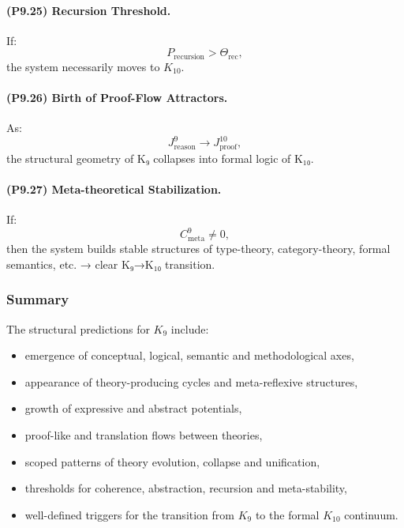 \paragraph{(P9.25) Recursion Threshold.}
If:
\[
P_{\mathrm{recursion}} > \Theta_{\mathrm{rec}},
\]
the system necessarily moves to $K_{10}$.

\paragraph{(P9.26) Birth of Proof-Flow Attractors.}
As:
\[
J_{\mathrm{reason}}^9 
\to 
J_{\mathrm{proof}}^{10},
\]
the structural geometry of K₉ collapses into formal logic of K₁₀.

\paragraph{(P9.27) Meta-theoretical Stabilization.}
If:
\[
C_{\mathrm{meta}}^9 \neq 0,
\]
then the system builds stable structures of type-theory, category-theory, formal semantics, etc. → clear K₉→K₁₀ transition.

\subsubsection{Summary}

The structural predictions for $K_9$ include:
\begin{itemize}
    \item emergence of conceptual, logical, semantic and methodological axes,
    \item appearance of theory-producing cycles and meta-reflexive structures,
    \item growth of expressive and abstract potentials,
    \item proof-like and translation flows between theories,
    \item scoped patterns of theory evolution, collapse and unification,
    \item thresholds for coherence, abstraction, recursion and meta-stability,
    \item well-defined triggers for the transition from $K_9$ to the formal $K_{10}$ continuum.
\end{itemize}

